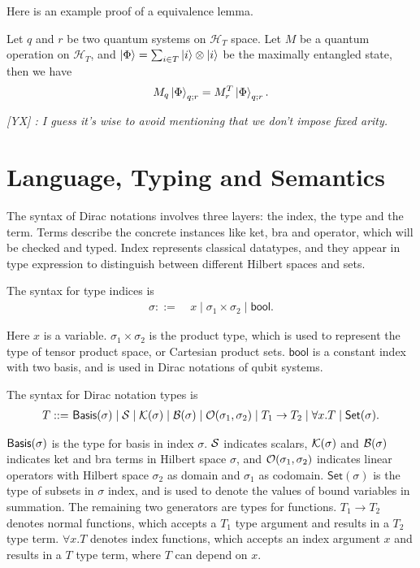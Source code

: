 \documentclass[runningheads]{llncs}
\newcommand{\yx}[1]{\textit{\color{blue}[YX] : #1}}
\begin{document}
Here is an example proof of a equivalence lemma.
\begin{example}
    Let $q$ and $r$ be two quantum systems on $\mathcal{H}_T$ space. Let $M$ be a quantum operation on $\mathcal{H}_T$,
    and $\ket{\Phi} = \sum_{i \in T} \ket{i}\otimes \ket{i}$ be the maximally entangled state, then we have
    \[
    M_q \ket{\Phi}_{q; r} = M_r^T \ket{\Phi}_{q; r}.
    \]
\end{example}


\yx{I guess it's wise to avoid mentioning that we don't impose fixed arity.}



\section{Language, Typing and Semantics}
The syntax of Dirac notations involves three layers: the index, the type and the term.
Terms describe the concrete instances like ket, bra and operator, which will be checked and typed.
Index represents classical datatypes, and they appear in type expression to distinguish between different Hilbert spaces and sets.

\begin{definition}
    The syntax for type indices is
    \begin{align*}
        \sigma ::=\ & x \mid \sigma_1 \times \sigma_2 \mid \mathsf{bool}.
    \end{align*}
\end{definition}
Here $x$ is a variable. $\sigma_1 \times \sigma_2$ is the product type, which is used to represent the type of tensor product space, or Cartesian product sets.
$\mathsf{bool}$ is a constant index with two basis, and is used in Dirac notations of qubit systems.



\begin{definition}
    The syntax for Dirac notation types is
    \begin{align*}
        T ::=\ & \mathsf{Basis}(\sigma) \mid \mathcal{S} \mid \mathcal{K}(\sigma) \mid \mathcal{B}(\sigma) \mid \mathcal{O}(\sigma_1, \sigma_2) \mid T_1 \to T_2 \mid \forall x.T \mid \mathsf{Set}(\sigma). \\
    \end{align*}
\end{definition}
$\mathsf{Basis}(\sigma)$ is the type for basis in index $\sigma$. $\mathcal{S}$ indicates scalars, $\mathcal{K}(\sigma)$ and $\mathcal{B}(\sigma)$ indicates ket and bra terms in Hilbert space $\sigma$, and $\mathcal{O}(\sigma_1, \sigma_2)$ indicates linear operators with Hilbert space $\sigma_2$ as domain and $\sigma_1$ as codomain.
$\mathsf{Set}(\sigma)$ is the type of subsets in $\sigma$ index, and is used to denote the values of bound variables in summation.
The remaining two generators are types for functions. $T_1 \to T_2$ denotes normal functions, which accepts a $T_1$ type argument and results in a $T_2$ type term. $\forall x. T$ denotes index functions, which accepts an index argument $x$ and results in a $T$ type term, where $T$ can depend on $x$.
\end{document}
